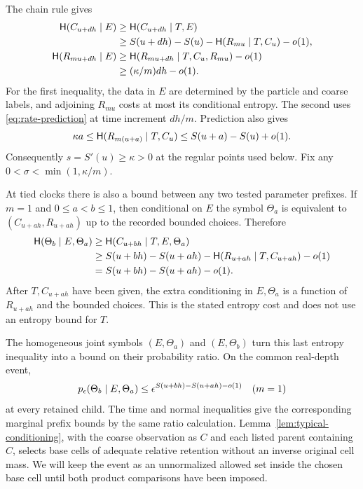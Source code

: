 The chain rule gives
\begin{align}
 \mathsf H(C_{u+dh}\mid E)
 &\ge\mathsf H(C_{u+dh}\mid T,E)\notag\\
 &\ge S(u+dh)-S(u)-\mathsf H(R_{mu}\mid T,C_u)-o(1),
 \label{eq:rate-time-child}\\
 \mathsf H(R_{mu+dh}\mid E)
 &\ge\mathsf H(R_{mu+dh}\mid T,C_u,R_{mu})-o(1)\notag\\
 &\ge(\kappa/m)dh-o(1).
 \label{eq:rate-normal-child}
\end{align}
For the first inequality, the data in $E$ are determined by the
particle and coarse labels, and adjoining $R_{mu}$ costs at most its
conditional entropy.  The second uses
\eqref{eq:rate-prediction} at time increment $dh/m$.
Prediction also gives
\[
 \kappa a\le\mathsf H(R_{m(u+a)}\mid T,C_u)
       \le S(u+a)-S(u)+o(1).
\]
Consequently $s=S'(u)\ge\kappa>0$ at the regular points used below.
Fix any $0<\sigma<\min(1,\kappa/m)$.

At tied clocks there is also a bound between any two tested parameter
prefixes.  If $m=1$ and $0\le a<b\le1$, then conditional on $E$ the
symbol $\Theta_a$ is equivalent to
$(C_{u+ah},R_{u+ah})$ up to the recorded bounded choices.  Therefore
\begin{align}
 \mathsf H(\Theta_b\mid E,\Theta_a)
 &\ge\mathsf H(C_{u+bh}\mid T,E,\Theta_a)\notag\\
 &\ge S(u+bh)-S(u+ah)
       -\mathsf H(R_{u+ah}\mid T,C_{u+ah})-o(1)\notag\\
 &=S(u+bh)-S(u+ah)-o(1).
 \label{eq:rate-joint-child-entropy}
\end{align}
After $T,C_{u+ah}$ have been given, the extra conditioning in
$E,\Theta_a$ is a function of $R_{u+ah}$ and the bounded choices.
This is the stated entropy cost and does not use an entropy bound for $T$.

The homogeneous joint symbols $(E,\Theta_a)$ and $(E,\Theta_b)$
turn this last entropy inequality into a bound on their probability
ratio.  On the common real-depth event,
\begin{equation}
 p_\epsilon(\Theta_b\mid E,\Theta_a)
 \le\epsilon^{S(u+bh)-S(u+ah)-o(1)}
 \quad(m=1)
 \label{eq:rate-joint-child-mass}
\end{equation}
at every retained child.  The time and normal inequalities give the
corresponding marginal prefix bounds by the same ratio calculation.
Lemma~\ref{lem:typical-conditioning}, with the coarse observation
as $C$ and each listed parent containing $C$, selects base cells
of adequate relative retention without an inverse original cell mass.
We will keep the event as an unnormalized allowed set inside the
chosen base cell until both product comparisons have been imposed.

